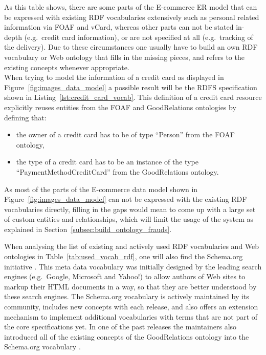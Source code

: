 As this table shows, there are some parts of the \gls{E-commerce} \gls{ER} model that can be expressed with existing \gls{RDF} vocabularies extensively such as personal related information via \gls{FOAF} and \gls{vCard}, whereas other parts can not be stated in-depth (e.g.\ credit card information), or are not specified at all (e.g.\ tracking of the delivery). Due to these circumstances one usually have to build an own \gls{RDF} vocabulary or Web ontology that fills in the missing pieces, and refers to the existing concepts whenever appropriate.\\

When trying to model the information of a credit card as displayed in Figure~\ref{fig:images_data_model} a possible result will be the \gls{RDFS} specification shown in Listing~\ref{lst:credit_card_vocab}. This definition of a credit card resource explicitly reuses entities from the \gls{FOAF} and GoodRelations ontologies by defining that: \@

\begin{itemize}
 \item the owner of a credit card has to be of type ``Person'' from the \gls{FOAF} ontology,
 \item the type of a credit card has to be an instance of the type ``PaymentMethodCreditCard'' from the GoodRelations ontology.
\end{itemize}

As most of the parts of the \gls{E-commerce} data model shown in Figure~\ref{fig:images_data_model} can not be expressed with the existing \gls{RDF} vocabularies directly, filling in the gaps would mean to come up with a large set of custom entities and relationships, which will limit the usage of the system as explained in Section~\ref{subsec:build_ontology_frauds}.


When analysing the list of existing and actively used \gls{RDF} vocabularies and Web ontologies in Table~\ref{tab:used_vocab_rdf}, one will also find the Schema.org initiative \citep{Schema.org}. This meta data vocabulary was initially designed by the leading search engines (e.g.\ Google, Microsoft and Yahoo!) to allow authors of Web sites to markup their \gls{HTML} documents in a way, so that they are better understood by these search engines. The Schema.org vocabulary is actively maintained by its community, includes new concepts with each release, and also offers an extension mechanism to implement additional vocabularies with terms that are not part of the core specifications \citep{SchemaExtensions} yet. In one of the past releases the maintainers also introduced all of the existing concepts of the GoodRelations ontology into the Schema.org vocabulary \citep{SchemaGoodRelation}. \\

